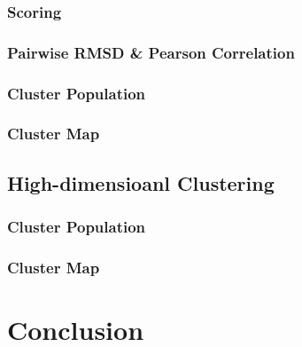 \documentclass[a4paper]{article}
\begin{document}
\subsubsection{Scoring}

\subsubsection{Pairwise RMSD \& Pearson Correlation}

\subsubsection{Cluster Population}

\subsubsection{Cluster Map}

\subsection{High-dimensioanl Clustering}

\subsubsection{Cluster Population}

\subsubsection{Cluster Map}

\section{Conclusion}


\pagebreak


\end{document}

